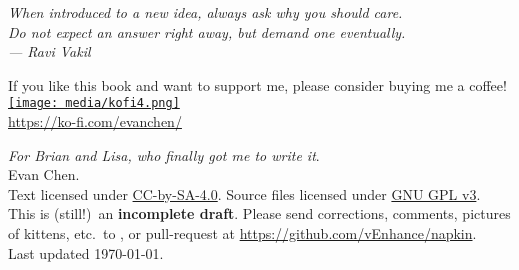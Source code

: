 \begin{titlepage}
	\vspace*{3cm}
	\begin{flushright}
		\large\itshape
		When introduced to a new idea, always ask why you should care. \\[0.2cm]
		Do not expect an answer right away, but demand one eventually. \\[0.8cm]
		--- Ravi Vakil \cite{ref:vakil}
	\end{flushright}

	\vspace*{8em}
	\hrulebar

	\begin{center}
	\begin{minipage}{50ex}
		\centering
		If you like this book and want to support me,
		please consider buying me a coffee! \\[2ex]
		\href{https://ko-fi.com/evanchen}{\texttt{[image: media/kofi4.png]}} \\
		\url{https://ko-fi.com/evanchen/}
	\end{minipage}
	\end{center}

	\vfill
	{
	\small
	\noindent \emph{For Brian and Lisa, who finally got me to write it}. \\[0.4cm]
	\noindent {\copyright} \the\year{} Evan Chen. \\
	Text licensed under
	\href{https://creativecommons.org/licenses/by-sa/4.0/}{CC-by-SA-4.0}.
	Source files licensed under
	\href{https://choosealicense.com/licenses/gpl-3.0/}{GNU GPL v3}.
	\\[0.4cm]
	This is (still!)\ an \textbf{incomplete draft}.
	Please send corrections, comments, pictures of kittens,
	etc.\ to ,
	or pull-request at \url{https://github.com/vEnhance/napkin}.
	\\[0.4cm]
	\noindent Last updated \today.
	\vspace*{1cm}
	}
\end{titlepage}
